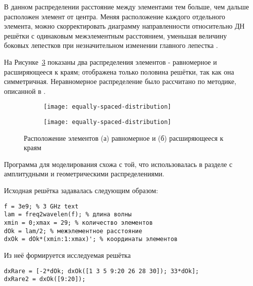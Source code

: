 В данном распределении расстояние между элементами тем больше, чем дальше расположен элемент от центра.
Меняя расположение каждого отдельного элемента, можно скорректировать диаграмму направленности
относительно ДН решётки с одинаковым межэлементным расстоянием, уменьшая величину боковых лепестков
при незначительном изменении главного лепестка \cite{harrington1961sidelobe}.

На Рисунке~\ref{fig:sidewiding-distribution-harr} показаны два распределения элементов - равномерное и
расширяющееся к краям; отображена только половина решётки, так как она симметричная.
Неравномерное распределение было рассчитано по методике, описанной в \cite{harrington1961sidelobe}.

\begin{figure}[!ht]
    \centering
    \begin{subfigure}[b]{0.8\textwidth}
        \centering
        \texttt{[image: equally-spaced-distribution]}
        \caption{}%
        \label{fig:sidewiding-distribution-equal}
    \end{subfigure}
    \begin{subfigure}[b]{0.8\textwidth}
        \centering
        \texttt{[image: equally-spaced-distribution]}
        \caption{}%
        \label{fig:sidewiding-distribution-unequal}
    \end{subfigure}
    \caption{%
    Расположение элементов 
	(а) равномерное и 
	(б) расширяющееся к краям
    }%
    \label{fig:sidewiding-distribution-harr}
\end{figure}





Программа для моделирования схожа с той, что использовалась в разделе с амплитудными и геометрическими распределениями.

Исходная решётка задавалась следующим образом:


\begin{verbatim}
f = 3e9; % 3 GHz text
lam = freq2wavelen(f); % длина волны
xmin = 0;xmax = 29; % количество элементов
dOk = lam/2; % межэлементное расстояние
dxOk = dOk*(xmin:1:xmax)'; % координаты элементов     
\end{verbatim}

Из неё формируется исследуемая решётка

\begin{verbatim}
dxRare = [-2*dOk; dxOk([1 3 5 9:20 26 28 30]); 33*dOk];
dxRare2 = dxOk([9:20]);   
\end{verbatim}

